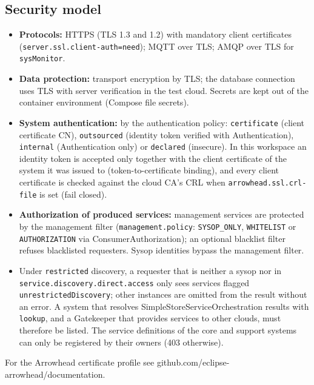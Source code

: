\documentclass[a4paper]{arrowhead}
\begin{document}
\subsection{Security model}

\begin{itemize}
  \item \textbf{Protocols:} HTTPS (TLS 1.3 and 1.2) with mandatory client certificates (\texttt{server.ssl.client-auth=need}); MQTT over TLS; AMQP over TLS for \texttt{sysMonitor}.
  \item \textbf{Data protection:} transport encryption by TLS; the database connection uses TLS with server verification in the test cloud. Secrets are kept out of the container environment (Compose file secrets).
  \item \textbf{System authentication:} by the authentication policy: \texttt{certificate} (client certificate CN), \texttt{outsourced} (identity token verified with Authentication), \texttt{internal} (Authentication only) or \texttt{declared} (insecure). In this workspace an identity token is accepted only together with the client certificate of the system it was issued to (token-to-certificate binding), and every client certificate is checked against the cloud CA's CRL when \texttt{arrowhead.ssl.crl-file} is set (fail closed).
  \item \textbf{Authorization of produced services:} management services are protected by the management filter (\texttt{management.policy}: \texttt{SYSOP\_ONLY}, \texttt{WHITELIST} or \texttt{AUTHORIZATION} via ConsumerAuthorization); an optional blacklist filter refuses blacklisted requesters. Sysop identities bypass the management filter.
  \item Under \texttt{restricted} discovery, a requester that is neither a sysop nor in \texttt{service.\allowbreak{}discovery.\allowbreak{}direct.\allowbreak{}access} only sees services flagged \texttt{unrestricted\allowbreak{}Discovery}; other instances are omitted from the result without an error. A system that resolves Simple\allowbreak{}Store\allowbreak{}Service\allowbreak{}Orchestration results with \texttt{lookup}, and a Gatekeeper that provides services to other clouds, must therefore be listed. The service definitions of the core and support systems can only be registered by their owners (403 otherwise).
\end{itemize}

For the Arrowhead certificate profile see github.com/eclipse-arrowhead/documentation.
\end{document}
